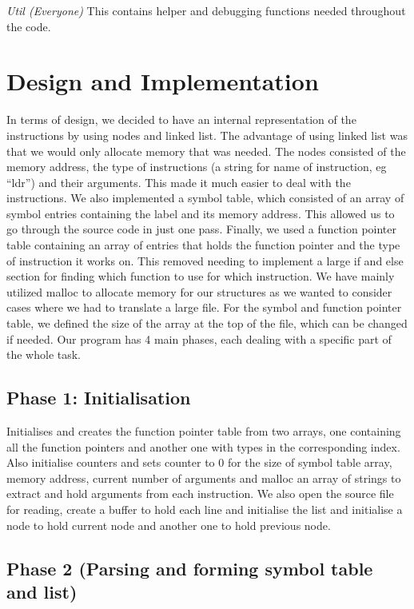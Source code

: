 \documentclass[12pt]{article}
\begin{document}
\emph{Util (Everyone)}
This contains helper and debugging functions needed throughout the code.

\section{Design and Implementation}

In terms of design, we decided to have an internal representation of the instructions by using nodes and linked list. The advantage of using linked list was that we would only allocate memory that was needed. The nodes consisted of the memory address, the type of instructions (a string for name of instruction, eg “ldr”) and their arguments. This made it much easier to deal with the instructions. We also implemented a symbol table, which consisted of an array of symbol entries containing the label and its memory address. This allowed us to go through the source code in just one pass. Finally, we used a function pointer table containing an array of entries that holds the function pointer and the type of instruction it works on. This removed needing to implement a large if and else section for finding which function to use for which instruction. We have mainly utilized malloc to allocate memory for our structures as we wanted to consider cases where we had to translate a large file. For the symbol and function pointer table, we defined the size of the array at the top of the file, which can be changed if needed.
Our program has 4 main phases, each dealing with a specific part of the whole task.

\subsection{Phase 1: Initialisation}

Initialises and creates the function pointer table from two arrays, one containing all the function pointers and another one with types in the corresponding index. Also initialise counters and sets counter to 0 for the size of symbol table array, memory address, current number of arguments and malloc an array of strings to extract and hold arguments from each instruction. We also open the source file for reading, create a buffer to hold each line and initialise the list and initialise a node to hold current node and another one to hold previous node.

\subsection{Phase 2 (Parsing and forming symbol table and list)}
\end{document}
